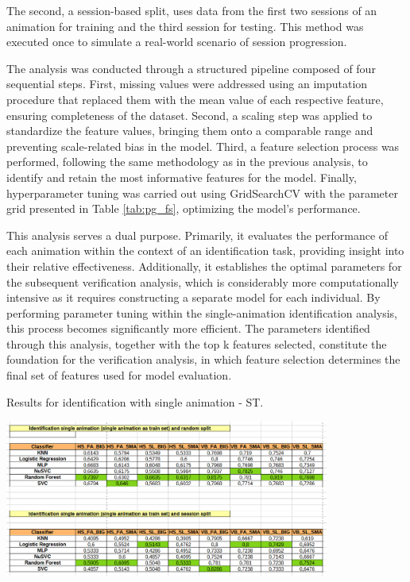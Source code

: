 \documentclass[12pt]{report}
\begin{document}
The second, a session-based split, uses data from the first two sessions of an animation for training and the third session for testing. 
This method was executed once to simulate a real-world scenario of session progression.

The analysis was conducted through a structured pipeline composed of four sequential steps. 
First, missing values were addressed using an imputation procedure that replaced them with the mean value of each respective feature, ensuring completeness of the dataset. 
Second, a scaling step was applied to standardize the feature values, bringing them onto a comparable range and preventing scale-related bias in the model. 
Third, a feature selection process was performed, following the same methodology as in the previous analysis, to identify and retain the most informative features for the model. 
Finally, hyperparameter tuning was carried out using GridSearchCV with the parameter grid presented in Table \ref{tab:pg_fs}, optimizing the model's performance.

This analysis serves a dual purpose. 
Primarily, it evaluates the performance of each animation within the context of an identification task, providing insight into their relative effectiveness. 
Additionally, it establishes the optimal parameters for the subsequent verification analysis, which is considerably more computationally intensive as it requires constructing a separate model for each individual. 
By performing parameter tuning within the single-animation identification analysis, this process becomes significantly more efficient. 
The parameters identified through this analysis, together with the top k features selected, constitute the foundation for the verification analysis, in which feature selection determines the final set of features used for model evaluation.

\begin{table}[ht]
    \centering
    \caption{Results for identification with single animation - ST.}
    \includegraphics[width=0.8\textwidth]{Images/Results/Identification_single/single_id_st.png}
    \label{tab:id_s_st}
\end{table}
\end{document}
